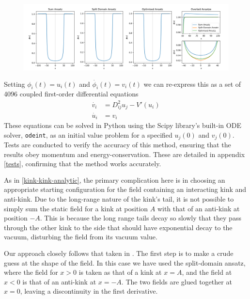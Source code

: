 \documentclass[11pt, oneside]{article}  	%
\numberwithin{equation}{section}
\begin{document}
 \begin{figure}
\centering
\includegraphics[width=\textwidth]{field_ansatze.png}
 \label{ansatze}
\end{figure}
Setting $\phi_i(t) = u_i(t)$ and $\dot{\phi_i}(t) = v_i(t)$ we can re-express this as a set of 4096 coupled first-order differential equations
\begin{align}
\dot{v_i} &= D^2_{ij}u_j - V'(u_i) \\
\dot{u_i} &= v_i 
\end{align}
 These equations can be solved in Python using the Scipy library's built-in ODE solver, \texttt{odeint}, as an initial value problem for a specified $u_{j}(0)$ and $v_{j}(0)$. Tests are conducted to verify the accuracy of this method, ensuring that the results obey momentum and energy-conservation. These are detailed in appendix \ref{tests}, confirming that the method works accurately.\par
 As in \textsection \ref{kink-kink-analytic}, the primary complication here is in choosing an appropriate starting configuration for the field containing an interacting kink and anti-kink. Due to the long-range nature of the kink's tail, it is not possible to simply sum the static field for a kink at position $A$ with that of an anti-kink at position $-A$. This is because the long range tails decay so slowly that they pass through the other kink to the side that should have exponential decay to the vacuum, disturbing the field from its vacuum value.\par
 Our approach closely follows that taken in \cite{christov-num}. The first step is to make a crude guess at the shape of the field. In this case we have used the split-domain ansatz, where the field for $x>0$ is taken as that of a kink at $x=A$, and the field at $x<0$ is that of an anti-kink at $x=-A$. The two fields are glued together at $x=0$, leaving a discontinuity in the first derivative.\par
\end{document}
